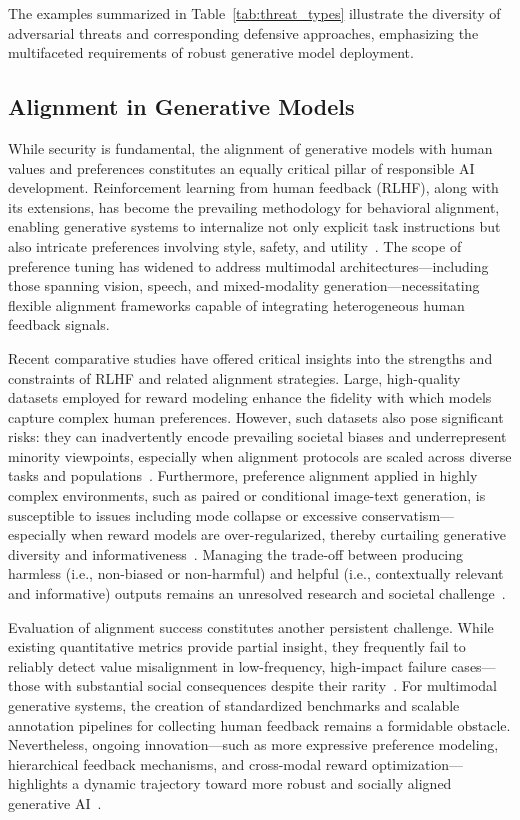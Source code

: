 \documentclass[sigconf]{acmart}
\begin{document}
The examples summarized in Table~\ref{tab:threat_types} illustrate the diversity of adversarial threats and corresponding defensive approaches, emphasizing the multifaceted requirements of robust generative model deployment.

\subsection{Alignment in Generative Models}

While security is fundamental, the alignment of generative models with human values and preferences constitutes an equally critical pillar of responsible AI development. Reinforcement learning from human feedback (RLHF), along with its extensions, has become the prevailing methodology for behavioral alignment, enabling generative systems to internalize not only explicit task instructions but also intricate preferences involving style, safety, and utility~\cite{ref69,ref75}. The scope of preference tuning has widened to address multimodal architectures—including those spanning vision, speech, and mixed-modality generation—necessitating flexible alignment frameworks capable of integrating heterogeneous human feedback signals.

Recent comparative studies have offered critical insights into the strengths and constraints of RLHF and related alignment strategies. Large, high-quality datasets employed for reward modeling enhance the fidelity with which models capture complex human preferences. However, such datasets also pose significant risks: they can inadvertently encode prevailing societal biases and underrepresent minority viewpoints, especially when alignment protocols are scaled across diverse tasks and populations~\cite{ref69}. Furthermore, preference alignment applied in highly complex environments, such as paired or conditional image-text generation, is susceptible to issues including mode collapse or excessive conservatism—especially when reward models are over-regularized, thereby curtailing generative diversity and informativeness~\cite{ref75}. Managing the trade-off between producing harmless (i.e., non-biased or non-harmful) and helpful (i.e., contextually relevant and informative) outputs remains an unresolved research and societal challenge~\cite{ref75}.

Evaluation of alignment success constitutes another persistent challenge. While existing quantitative metrics provide partial insight, they frequently fail to reliably detect value misalignment in low-frequency, high-impact failure cases—those with substantial social consequences despite their rarity~\cite{ref75}. For multimodal generative systems, the creation of standardized benchmarks and scalable annotation pipelines for collecting human feedback remains a formidable obstacle. Nevertheless, ongoing innovation—such as more expressive preference modeling, hierarchical feedback mechanisms, and cross-modal reward optimization—highlights a dynamic trajectory toward more robust and socially aligned generative AI~\cite{ref69,ref75}.
\end{document}
